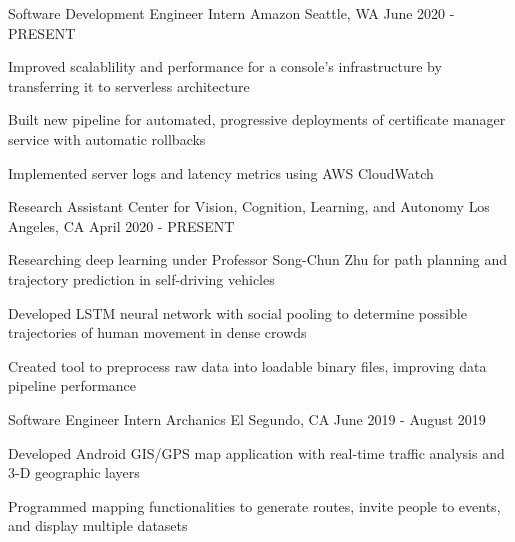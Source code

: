 \documentclass[12pt, letterpaper]{awesome-cv}
\begin{document}
\begin{cventries}
  \cventry
    {Sof\/tware Development Engineer Intern} %
    {Amazon} %
    {Seattle, WA} %
    {June 2020 - PRESENT} %
    {
      \begin{cvitems} %
        \item {Improved scalablility and performance for a console's infrastructure by transferring it to serverless architecture} 
        \item {Built new pipeline for automated, progressive deployments of certificate manager service with automatic rollbacks}
        \item {Implemented server logs and latency metrics using AWS CloudWatch }
      \end{cvitems}
    }

  \cventry
    {Research Assistant} %
    {Center for Vision, Cognition, Learning, and Autonomy} %
    {Los Angeles, CA} %
    {April 2020 - PRESENT} %
    {
      \begin{cvitems} %
        \item {Researching deep learning under Professor Song-Chun Zhu for path planning and trajectory prediction in self-driving vehicles}
        \item {Developed LSTM neural network with social pooling to determine possible trajectories of human movement in dense crowds}
        \item {Created tool to preprocess raw data into loadable binary files, improving data pipeline performance}
      \end{cvitems}
    }

  \cventry
    {Sof\/tware Engineer Intern} %
    {Archanics} %
    {El Segundo, CA} %
    {June 2019 - August 2019} %
    {
      \begin{cvitems} %
        \item {Developed Android GIS/GPS map application with real-time traf\/fic analysis and 3-D geographic layers}
        \item {Programmed mapping functionalities to generate routes, invite people to events, and display multiple datasets}
      \end{cvitems}
    }


\end{cventries}
\end{document}
